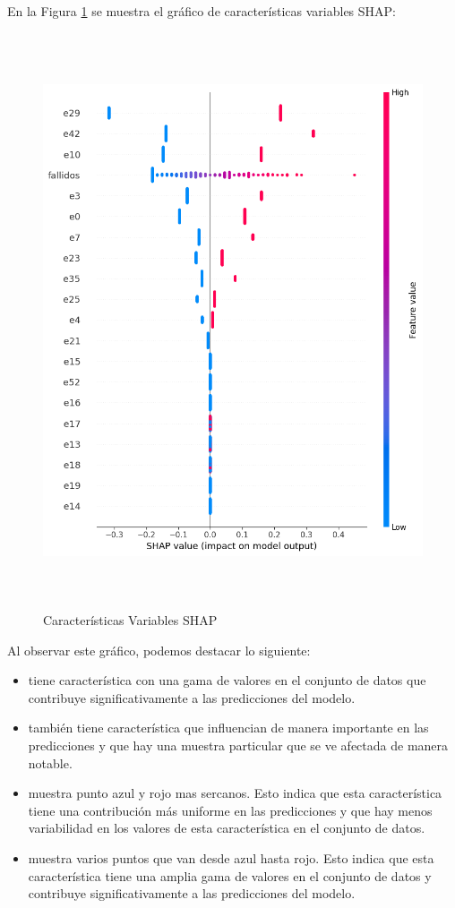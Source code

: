 En la Figura \ref{fig:caract_var_shap_lr1} se muestra el gráfico de características variables SHAP:

\begin{figure}[H]
    \centering
    \includegraphics[width=6.0611in,height=6.6861in]{img/shap_lr/shapForcePlot_lr.png}
    \caption{Características Variables SHAP}
    \label{fig:caract_var_shap_lr1}
\end{figure}

Al observar este gráfico, podemos destacar lo siguiente:

\begin{itemize}
    \item {} tiene característica con una gama de valores en el conjunto de datos que contribuye significativamente a las predicciones del modelo.
    \item {} también tiene característica que influencian de manera importante en las predicciones y que hay una muestra particular que se ve afectada de manera notable.
    \item {} muestra punto azul y rojo mas sercanos. Esto indica que esta característica tiene una contribución más uniforme en las predicciones y que hay menos variabilidad en los valores de esta característica en el conjunto de datos.
    \item {} muestra varios puntos que van desde azul hasta rojo. Esto indica que esta característica tiene una amplia gama de valores en el conjunto de datos y contribuye significativamente a las predicciones del modelo.
\end{itemize}

